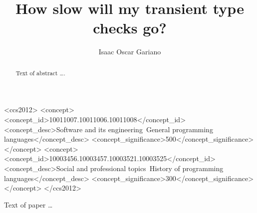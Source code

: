 \documentclass[sigplan,10pt,review,anonymous,screen]{acmart}\settopmatter{printfolios=true}
\begin{document}
\title{How slow will my transient type checks go?}

\author{Isaac Oscar Gariano}

\begin{abstract}
Text of abstract \ldots.
\end{abstract}


\begin{CCSXML}
<ccs2012>
<concept>
<concept_id>10011007.10011006.10011008</concept_id>
<concept_desc>Software and its engineering~General programming languages</concept_desc>
<concept_significance>500</concept_significance>
</concept>
<concept>
<concept_id>10003456.10003457.10003521.10003525</concept_id>
<concept_desc>Social and professional topics~History of programming languages</concept_desc>
<concept_significance>300</concept_significance>
</concept>
</ccs2012>
\end{CCSXML}
\maketitle

Text of paper \ldots
\end{document}
